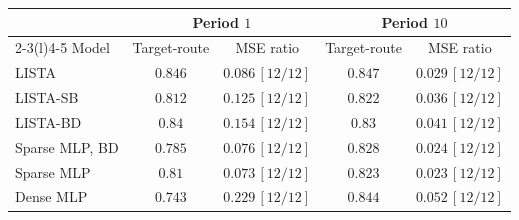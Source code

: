 \begin{tabular}{@{}l cc cc@{}}
\toprule
& \multicolumn{2}{c}{Period $1$} & \multicolumn{2}{c}{Period $10$} \\
\cmidrule(lr){2-3}\cmidrule(l){4-5}
Model & Target-route & MSE ratio & Target-route & MSE ratio \\
\midrule
LISTA & $\mathbf{0.846}$ & $0.086\,[12/12]$ & $\mathbf{0.847}$ & $0.029\,[12/12]$ \\
LISTA-SB & $0.812$ & $0.125\,[12/12]$ & $0.822$ & $0.036\,[12/12]$ \\
LISTA-BD & $0.84$ & $0.154\,[12/12]$ & $0.83$ & $0.041\,[12/12]$ \\
Sparse MLP, BD & $0.785$ & $0.076\,[12/12]$ & $0.828$ & $0.024\,[12/12]$ \\
Sparse MLP & $0.81$ & $\mathbf{0.073}\,[12/12]$ & $0.823$ & $\mathbf{0.023}\,[12/12]$ \\
Dense MLP & $0.743$ & $0.229\,[12/12]$ & $0.844$ & $0.052\,[12/12]$ \\
\bottomrule
\end{tabular}
